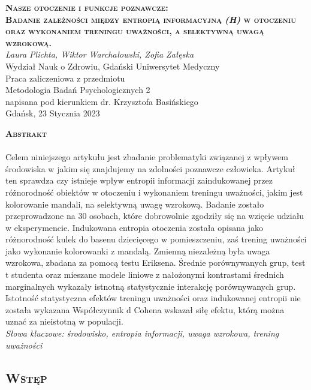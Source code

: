 \documentclass[12pt,a4paper,final,oneside,onecolumn,titlepage]{article}
\begin{document}
\pagestyle{fancy}
\fancyhead{}
\fancyfoot{}
\rhead{\thepage}

\begin{titlepage}
  \thispagestyle{empty}
  \rhead{\thepage}
  \begin{center}
  \vspace*{1cm}
  \Large
  \textbf{\textsc{Nasze otoczenie i funkcje poznawcze:\\ Badanie zależności między entropią informacyjną \textit{(H)} w otoczeniu oraz wykonaniem treningu uważności, a selektywną uwagą wzrokową.\\}}
  \vspace{1.5cm}
  \textit{Laura Plichta, Wiktor Warchałowski, Zofia Załęska\\}
  Wydział Nauk o Zdrowiu, Gdański Uniwersytet Medyczny\\
  \vspace{3cm}
  Praca zaliczeniowa z przedmiotu \\ Metodologia Badań Psychologicznych 2 \\ napisana pod kierunkiem dr. Krzysztofa Basińskiego\\
  \vspace{3cm}
  Gdańsk, 23 Stycznia 2023
  \end{center}
\end{titlepage}
\begin{center}
  \vspace*{0.5cm}
  \large{\textbf{\textsc{Abstrakt}}}
\end{center}
\paragraph{}
Celem niniejszego artykułu jest zbadanie problematyki związanej z wpływem środowiska w jakim się znajdujemy na zdolności poznawcze człowieka. Artykuł ten sprawdza czy istnieje wpływ entropii informacji zaindukowanej przez różnorodność obiektów w otoczeniu i wykonaniem treningu uważności, jakim jest kolorowanie mandali, na selektywną uwagę wzrokową. Badanie zostało przeprowadzone na 30 osobach, które dobrowolnie zgodziły się na wzięcie udziału w eksperymencie. Indukowana entropia otoczenia została opisana jako różnorodność kulek do basenu dziecięcego w pomieszczeniu, zaś trening uważności jako wykonanie kolorowanki z mandalą. Zmienną niezależną była uwaga wzrokowa, zbadana za pomocą testu Eriksena. Średnie porównywanych grup, test t studenta oraz mieszane modele liniowe z nałożonymi kontrastami średnich marginalnych wykazały istnotną statystycznie interakcję porównywanych grup. Istotność statystyczna efektów treningu uważności oraz indukowanej entropii nie została wykazana Współczynnik d Cohena wskazał siłę efektu, którą można uznać za nieistotną w populacji.
\\
\textit{Słowa kluczowe: środowisko, entropia informacji, uwaga wzrokowa, trening uważności}
\newpage
\begin{center}
\section*{\large{\textbf{\textsc{Wstęp}}}}
\end{center}
\end{document}
